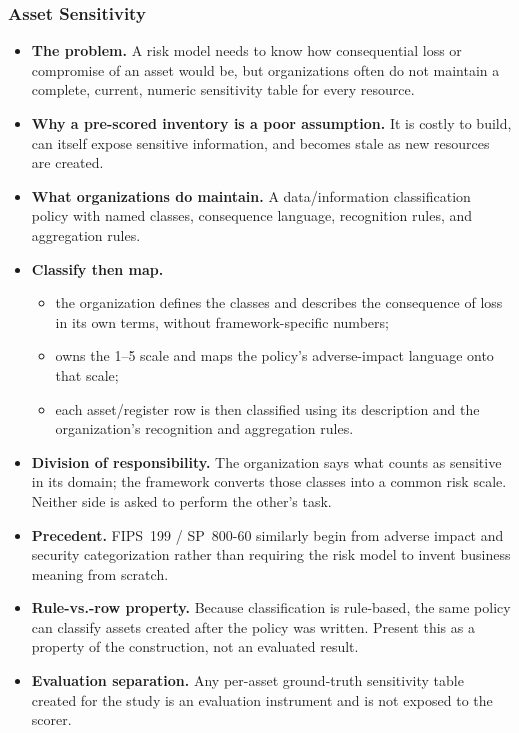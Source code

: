 \subsubsection{Asset Sensitivity}
\label{sec:sensitivity}
\begin{itemize}
  \item \textbf{The problem.} A risk model needs to know how consequential loss
        or compromise of an asset would be, but organizations often do not
        maintain a complete, current, numeric sensitivity table for every
        resource.

  \item \textbf{Why a pre-scored inventory is a poor assumption.} It is costly to
        build, can itself expose sensitive information, and becomes stale as new
        resources are created.

  \item \textbf{What organizations do maintain.} A data/information
        classification policy with named classes, consequence language,
        recognition rules, and aggregation rules.

  \item \textbf{Classify then map.}
    \begin{itemize}
      \item the organization defines the classes and describes the consequence
            of loss in its own terms, without framework-specific numbers;
      \item \framework{} owns the 1--5 scale and maps the policy's adverse-impact
            language onto that scale;
      \item each asset/register row is then classified using its description and
            the organization's recognition and aggregation rules.
    \end{itemize}

  \item \textbf{Division of responsibility.} The organization says what counts
        as sensitive in its domain; the framework converts those classes into a
        common risk scale. Neither side is asked to perform the other's task.

  \item \textbf{Precedent.} FIPS~199 / SP~800-60 similarly begin from adverse
        impact and security categorization rather than requiring the risk model
        to invent business meaning from scratch.

  \item \textbf{Rule-vs.-row property.} Because classification is rule-based, the
        same policy can classify assets created after the policy was written.
        Present this as a property of the construction, not an evaluated result.

  \item \textbf{Evaluation separation.} Any per-asset ground-truth sensitivity
        table created for the study is an evaluation instrument and is not
        exposed to the scorer.
\end{itemize}

